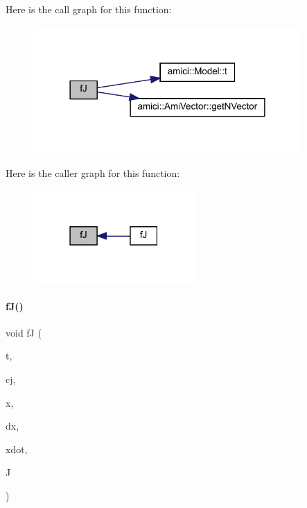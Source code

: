 Here is the call graph for this function\+:
\nopagebreak
\begin{figure}[H]
\begin{center}
\leavevmode
\includegraphics[width=290pt]{classamici_1_1_model___d_a_e_a99337eaeac6c70528c3464affe13df2e_cgraph}
\end{center}
\end{figure}
Here is the caller graph for this function\+:
\nopagebreak
\begin{figure}[H]
\begin{center}
\leavevmode
\includegraphics[width=174pt]{classamici_1_1_model___d_a_e_a99337eaeac6c70528c3464affe13df2e_icgraph}
\end{center}
\end{figure}
\mbox{\label{classamici_1_1_model___d_a_e_ae0cdcd849f238e5ca375253f802e497c}} 
\paragraph{\texorpdfstring{f\+J()}{fJ()}\hspace{0.1cm}{\footnotesize\ttfamily [2/3]}}
{\footnotesize\ttfamily void fJ (\begin{DoxyParamCaption}\item[{\mbox{\hyperlink{namespaceamici_a1bdce28051d6a53868f7ccbf5f2c14a3}{realtype}}}]{t,  }\item[{\mbox{\hyperlink{namespaceamici_a1bdce28051d6a53868f7ccbf5f2c14a3}{realtype}}}]{cj,  }\item[{N\+\_\+\+Vector}]{x,  }\item[{N\+\_\+\+Vector}]{dx,  }\item[{N\+\_\+\+Vector}]{xdot,  }\item[{Dls\+Mat}]{J }\end{DoxyParamCaption})}

